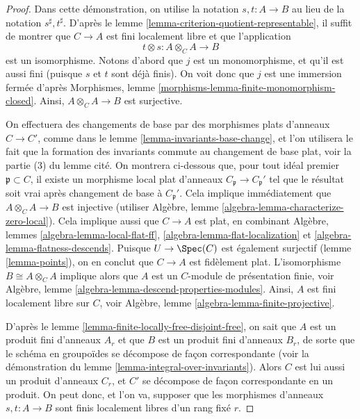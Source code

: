 \begin{proof}
Dans cette démonstration, on utilise la notation $s, t : A \to B$
au lieu de la notation $s^\sharp, t^\sharp$.
D'après le lemme \ref{lemma-criterion-quotient-representable},
il suffit de montrer que $C \to A$ est fini localement libre
et que l'application
$$
t \otimes s : A \otimes_C A \longrightarrow B
$$
est un isomorphisme. Notons d'abord que $j$ est un monomorphisme, et
qu'il est aussi fini (puisque $s$ et $t$ sont déjà finis). On voit donc
que $j$ est une immersion fermée d'après
Morphismes, lemme \ref{morphisms-lemma-finite-monomorphism-closed}.
Ainsi, $A \otimes_C A \to B$ est surjective.

\medskip\noindent
On effectuera des changements de base par des morphismes plats d'anneaux $C \to C'$, comme dans
le lemme \ref{lemma-invariants-base-change}, et l'on utilisera le fait que
la formation des invariants commute au changement de base plat, voir
la partie (3) du lemme cité.
On montrera ci-dessous que, pour tout idéal premier $\mathfrak p \subset C$, il existe
un morphisme local plat d'anneaux $C_{\mathfrak p} \to C_{\mathfrak p}'$
tel que le résultat soit vrai après changement de base à $C_{\mathfrak p}'$.
Cela implique immédiatement
que $A \otimes_C A \to B$ est injective (utiliser
Algèbre, lemme \ref{algebra-lemma-characterize-zero-local}).
Cela implique aussi que $C \to A$ est plat, en combinant
Algèbre, lemmes \ref{algebra-lemma-local-flat-ff},
\ref{algebra-lemma-flat-localization} et
\ref{algebra-lemma-flatness-descends}. Puisque $U \to \Spec(C)$
est également surjectif (lemme \ref{lemma-points}), on en conclut que $C \to A$
est fidèlement plat. L'isomorphisme $B \cong A \otimes_C A$
implique alors que $A$ est un $C$-module de présentation finie, voir
Algèbre, lemme \ref{algebra-lemma-descend-properties-modules}.
Ainsi, $A$ est fini localement libre sur $C$, voir
Algèbre, lemme \ref{algebra-lemma-finite-projective}.

\medskip\noindent
D'après le lemme \ref{lemma-finite-locally-free-disjoint-free},
on sait que $A$ est un produit fini
d'anneaux $A_r$ et que $B$ est un produit fini d'anneaux $B_r$,
de sorte que le schéma en groupoïdes se décompose de façon correspondante (voir la démonstration
du lemme \ref{lemma-integral-over-invariants}).
Alors $C$ est lui aussi un produit d'anneaux $C_r$, et
$C'$ se décompose de façon correspondante en un produit. On peut donc, et l'on va,
supposer que les morphismes d'anneaux $s, t : A \to B$ sont finis
localement libres d'un rang fixé $r$.


\end{proof}
